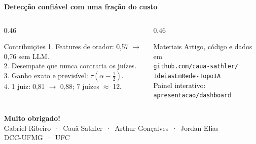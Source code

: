 \documentclass[aspectratio=169,11pt]{beamer}
\begin{document}
\begin{frame}[plain]
  \vspace{0.6cm}
  \begin{center}
    {\Large\textbf{Detecção confiável com uma fração do custo}}\\[0.4cm]
    \begin{columns}[T]
      \begin{column}{0.46\textwidth}
        \begin{block}{\centering Contribuições}\small
          1. Features de orador: 0,57 $\to$ 0,76 sem LLM.\\
          2. Desempate que nunca contraria os juízes.\\
          3. Ganho exato e previsível: $\tau(\alpha - \frac12)$.\\
          4. 1 juiz: 0,81 $\to$ 0,88; 7 juízes $\approx$ 12.
        \end{block}
      \end{column}
      \begin{column}{0.46\textwidth}
        \begin{exampleblock}{\centering Materiais}\small
          Artigo, código e dados em\\
          \texttt{github.com/caua-sathler/}\\\texttt{IdeiasEmRede-TopoIA}\\[3pt]
          Painel interativo: \texttt{apresentacao/dashboard}
        \end{exampleblock}
      \end{column}
    \end{columns}
    \vspace{0.5cm}
    \textbf{Muito obrigado!}\\[2pt]
    \small Gabriel Ribeiro \,·\, Cauã Sathler \,·\, Arthur Gonçalves \,·\, Jordan Elias\\[1pt]
    \scriptsize DCC-UFMG \,·\, UFC
  \end{center}
\end{frame}
\end{document}
